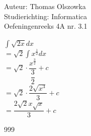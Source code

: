 \documentclass[a4paper]{article}
\newcommand{\dint}{\displaystyle\int}
\begin{document}
\noindent \large Auteur: Thomas Olszowka \\
\noindent \large Studierichting: Informatica \\
\noindent \large Oefeningenreeks 4A nr. 3.1  \\



\medskip

\normalsize

$\dint \sqrt{2x} dx$ \\

$= \sqrt{2} \dint x^{\tfrac{1}{2}} dx$ \\

$= \sqrt{2} \cdot \dfrac{x^{\tfrac{3}{2}}}{\dfrac{3}{2}} + c$ \\

$= \sqrt{2} \cdot \dfrac{2\sqrt{x^3}}{3} + c$ \\

$=  \dfrac{2\sqrt{2}x\sqrt{x}}{3} + c$ \\

\begin{thebibliography}{999}
\end{thebibliography}
\end{document}
